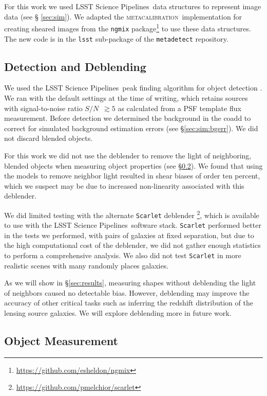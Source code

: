 \documentclass[twocolumn,twocolappendix,astrosym]{openjournal}
\newcommand{\snr}{$S/N$}
\newcommand{\dm}{LSST Science Pipelines}
\newcommand{\mcal}{\textsc{metacalibration}}
\begin{document}
For this work we used \dm\ data structures to represent image data (see \S
\ref{sec:sim}).  We adapted the \mcal\ implementation for creating sheared
images from the \texttt{ngmix}
package\footnote{\url{https://github.com/esheldon/ngmix}} to use these data
structures.  The new code is in the \texttt{lsst} sub-package of
the \texttt{metadetect} repository.


\subsection{Detection and Deblending} \label{sec:mdet:detect}

We used the \dm\ peak finding algorithm for object detection
\citep{BoschHSC2017}.  We ran with the default settings at the time of writing,
which retains sources with signal-to-noise ratio \snr\ $\gtrsim 5$ as
calculated from a PSF template flux measurement.  Before detection we
determined the background in the coadd to correct for simulated background
estimation errors (see \S \ref{sec:sim:bgerr}).  We did not discard blended
objects.

For this work we did not use the deblender to remove the light of neighboring,
blended objects when measuring object properties (see \S \ref{sec:mdet:meas}).
We found that using the models to remove neighbor light resulted in shear
biases of order ten percent, which we suspect may be due to increased
non-linearity associated with this deblender.

We did limited testing with the alternate \texttt{Scarlet} deblender
\citep{MelchiorScarlet2018}\footnote{\url{https://github.com/pmelchior/scarlet}},
which is available to use with the \dm\ software stack. \texttt{Scarlet}
performed better in the tests we performed, with pairs of galaxies at fixed
separation, but due to the high computational cost of the deblender, we did not
gather enough statistics to perform a comprehensive analysis.  We also did not
test \texttt{Scarlet} in more realistic scenes with many randomly places
galaxies.

As we will show in \S \ref{sec:results}, measuring shapes without deblending
the light of neighbors caused no detectable bias.  However, deblending may
improve the accuracy of other critical tasks such as inferring the redshift
distribution of the lensing source galaxies.  We will explore deblending more
in future work.

\subsection{Object Measurement} \label{sec:mdet:meas}
\end{document}
